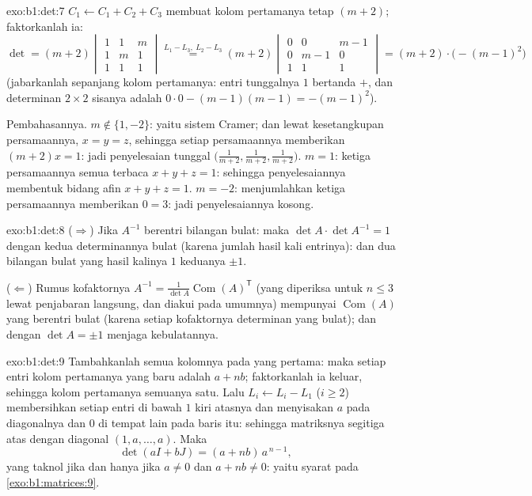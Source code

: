 \begin{solution}{exo:b1:det:7}
$C_1 \leftarrow C_1 + C_2 + C_3$ membuat kolom pertamanya tetap
$(m+2)$; faktorkanlah ia:
\[
\det = (m+2)\begin{vmatrix}
1 & 1 & m\\ 1 & m & 1\\ 1 & 1 & 1
\end{vmatrix}
\overset{L_1 - L_3,\ L_2 - L_3}{=}
(m+2)\begin{vmatrix}
0 & 0 & m-1\\ 0 & m-1 & 0\\ 1 & 1 & 1
\end{vmatrix}
= (m+2)\cdot\bigl(-(m-1)^2\bigr)
\]
(jabarkanlah sepanjang kolom pertamanya: entri tunggalnya $1$ bertanda
$+$, dan determinan $2 \times 2$ sisanya adalah $0 \cdot 0 -
(m-1)(m-1) = -(m-1)^2$).

Pembahasannya. $m \notin \{1, -2\}$: yaitu sistem Cramer; dan lewat kesetangkupan
persamaannya, $x = y = z$, sehingga setiap persamaannya memberikan $(m + 2)x = 1$:
jadi penyelesaian tunggal $\bigl(\frac{1}{m+2}, \frac{1}{m+2},
\frac{1}{m+2}\bigr)$. $m = 1$: ketiga persamaannya semua terbaca $x + y
+ z = 1$: sehingga penyelesaiannya membentuk bidang afin $x + y + z = 1$. $m = -2$:
menjumlahkan ketiga persamaannya memberikan $0 = 3$: jadi  penyelesaiannya kosong.
\end{solution}

\begin{solution}{exo:b1:det:8}
($\Rightarrow$) Jika $A^{-1}$ berentri bilangan bulat: maka $\det A \cdot \det
A^{-1} = 1$ dengan kedua determinannya bulat (karena jumlah hasil kali
entrinya): dan dua bilangan bulat yang hasil kalinya $1$ keduanya $\pm1$.

($\Leftarrow$) Rumus kofaktornya $A^{-1} = \frac{1}{\det
A}\operatorname{Com}(A)^{\mathsf T}$ (yang diperiksa untuk $n \leq 3$ lewat
penjabaran langsung, dan diakui pada umumnya) mempunyai
$\operatorname{Com}(A)$ yang berentri bulat (karena setiap kofaktornya
determinan yang bulat); dan  dengan $\det A = \pm 1$ menjaga kebulatannya.
\end{solution}

\begin{solution}{exo:b1:det:9}
Tambahkanlah semua kolomnya pada yang pertama: maka setiap entri kolom pertamanya yang baru adalah
$a + nb$; faktorkanlah ia keluar, sehingga kolom pertamanya semuanya satu. Lalu
 $L_i \leftarrow L_i - L_1$ ($i \geq 2$) membersihkan
setiap entri di bawah $1$ kiri atasnya dan menyisakan $a$ pada diagonalnya dan
$0$ di tempat lain pada baris itu: sehingga matriksnya segitiga atas dengan
diagonal $(1, a, \dots, a)$. Maka
\[
\det(aI + bJ) = (a + nb)\, a^{\,n-1} ,
\]
yang taknol jika dan hanya jika $a \neq 0$ dan $a + nb \neq 0$: yaitu syarat pada
\cref{exo:b1:matrices:9}.
\end{solution}

